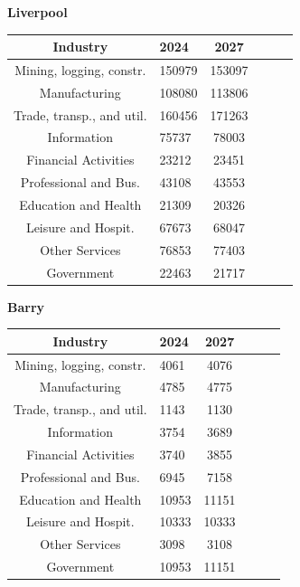 \documentclass{article}
\begin{document}
\begin{table}[h]
\centering
\textbf{Liverpool} \\
\begin{tabularx}{210pt}{|c|X|c|X|c|X|}
    \hline
    \textbf{Industry} & \textbf{2024} & \textbf{2027} \\
    \hline
    Mining, logging, constr. & 150979 & 153097 \\
    \hline
    Manufacturing & 108080 & 113806 \\
    \hline
    Trade, transp., and util. & 160456 & 171263 \\
    \hline
    Information & 75737 & 78003  \\
    \hline
    Financial Activities & 23212 & 23451 \\
    \hline
    Professional and Bus. & 43108 & 43553 \\
    \hline
    Education and Health & 21309 & 20326 \\
    \hline
    Leisure and Hospit. & 67673 & 68047 \\
    \hline
    Other Services & 76853 & 77403 \\
    \hline
    Government & 22463 & 21717 \\
    \hline
\end{tabularx}
\end{table}
\newpage
\begin{table}[h]
\centering
\textbf{Barry} \\
\begin{tabularx}{210pt}{|c|X|c|X|c|X|}
    \hline
    \textbf{Industry} & \textbf{2024} & \textbf{2027} \\
    \hline
    Mining, logging, constr. & 4061 & 4076 \\
    \hline
    Manufacturing & 4785 & 4775 \\
    \hline
    Trade, transp., and util. & 1143 & 1130 \\
    \hline
    Information & 3754 & 3689  \\
    \hline
    Financial Activities & 3740 & 3855 \\
    \hline
    Professional and Bus. & 6945 & 7158 \\
    \hline
    Education and Health & 10953 & 11151 \\
    \hline
    Leisure and Hospit. & 10333 & 10333 \\
    \hline
    Other Services & 3098 & 3108 \\
    \hline
    Government & 10953 & 11151 \\
    \hline
\end{tabularx}
\end{table}
\end{document}
